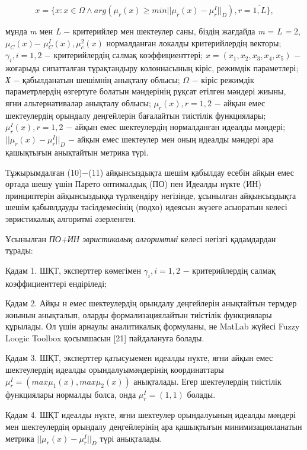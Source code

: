 \begin{equation}
x = \{ x : x \in \Omega \wedge arg(\mu_r(x)\geq min ||\mu_r(x)-\mu_r^I||_D),r=\overline{1,L}\},
\end{equation}

\begin{multicols}{2}
мұнда \emph{m} мен \emph{L} − критерийлер мен шектеулер саны, біздің
жағдайда \emph{m} = \emph{L =} 2, $\mu_C(x)$−
$\mu^I_C(x),\mu_c^2(x)$ нормалданған локалды критерийлердің
векторы; $\gamma_i,i=1,2$ − критерийлердің салмақ
коэффициенттері; $x=(x_1,x_2,x_3,x_4,x_5)$ − жоғарыда
сипатталған тұрақтандыру колоннасының кіріс, режимдік параметлері;
\emph{Х} − қабылданатын шешімнің анықталу облысы;
$\Omega$ − кіріс режимдік параметрлердің
өзгертуге болатын мәндерінің рұқсат етілген мәндері жиыны, яғни
альтернативалар анықталу облысы; $\mu_r(x),r=1,2$ −
айқын емес шектеулердің орындалу деңгейлерін бағалайтын тиістілік
функциялары; $\mu_r^I(x),r=1,2$ − айқын емес
шектеулердің нормалданған идеалды мәндері;
$||\mu_r(x)-\mu_r^I||_D$ − айқын емес шектеулер мен оның
идеалды мәндері ара қашықтығын анықтайтын метрика түрі.

Тұжырымдалған (10)−(11) айқынсыздықта шешім қабылдау есебін айқын емес
ортада шешу үшін Парето оптималдық (ПО) пен Идеалды нүкте (ИН)
принциптерін айқынсыздыққа түрлкендіру негізінде, ұсынылған
айқынсыздықта шешім қабывлдауды тәсілдемесінің (подхо) идеясын жүзеге
асыоратын келесі эвристикалық алгоритмі әзерленген.

Ұсынылған \emph{ПО+ИН эвристикалық алгоримтмі} келесі негізгі
қадамдардан тұрады:

Қадам 1. ШҚТ, эксперттер көмегімен $\gamma_i,i=1,2$ − критерийлердің
салмақ коэффициенттері ендіріледі;

Қадам 2. Айқы н емес шектеулердің орындалу деңгейлерін анықтайтын
термдер жиынын анықталып, оларды формализациялайтын тиістілік
функциялары құрылады. Ол үшін арнаулы аналитикалық формуланы, не
MatLab жүйесі Fuzzy Loogic Toolbox қосымшасын {[}21{]} пайдалануға
болады.

Қадам 3. ШҚТ, эксперттер қатысуыемен идеалды нүкте, яғни айқын емес
шектеулердің идеалды орындалуымәндерінің координаттары
$\mu_r^I=(max\mu_1(x),max\mu_2(x))$ анықталады. Егер шектеулердің
тиістілік функциялары нормалды болса, онда $\mu_r^I=(1,1)$ болады.

Қадам 4. ШҚТ идеалды нүкте, яғни шектеулер орындалуының идеалды мәндері
мен шектеулердің орындалу деңгейлерінің ара қашықтығын
минимизацияланатын метрика $||\mu_r(x)-\mu_r^I||_D$ түрі
анықталады.


\end{multicols}
